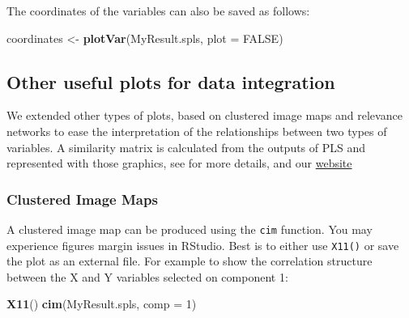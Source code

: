 \documentclass[]{book}
\newenvironment{Shaded}{\begin{snugshade}}{\end{snugshade}}
\newcommand{\DataTypeTok}[1]{\textcolor[rgb]{0.13,0.29,0.53}{#1}}
\newcommand{\DecValTok}[1]{\textcolor[rgb]{0.00,0.00,0.81}{#1}}
\newcommand{\KeywordTok}[1]{\textcolor[rgb]{0.13,0.29,0.53}{\textbf{#1}}}
\newcommand{\NormalTok}[1]{#1}
\newcommand{\OtherTok}[1]{\textcolor[rgb]{0.56,0.35,0.01}{#1}}
\newcommand{\StringTok}[1]{\textcolor[rgb]{0.31,0.60,0.02}{#1}}
\begin{document}
The coordinates of the variables can also be saved as follows:

\begin{Shaded}
\begin{Highlighting}[]
\NormalTok{coordinates <-}\StringTok{ }\KeywordTok{plotVar}\NormalTok{(MyResult.spls, }\DataTypeTok{plot =} \OtherTok{FALSE}\NormalTok{)}
\end{Highlighting}
\end{Shaded}

\hypertarget{other-useful-plots-for-data-integration}{%
\subsection{Other useful plots for data integration}\label{other-useful-plots-for-data-integration}}

We extended other types of plots, based on clustered image maps and relevance networks to ease the interpretation of the relationships between two types of variables. A similarity matrix is calculated from the outputs of PLS and represented with those graphics, see \citep{Gon12} for more details, and our \href{http://mixomics.org/graphics/variable-plots/}{website}

\hypertarget{clustered-image-maps}{%
\subsubsection{Clustered Image Maps}\label{clustered-image-maps}}

A clustered image map can be produced using the \texttt{cim} function. You may experience figures margin issues in RStudio. Best is to either use \texttt{X11()} or save the plot as an external file. For example to show the correlation structure between the X and Y variables selected on component 1:

\begin{Shaded}
\begin{Highlighting}[]
\KeywordTok{X11}\NormalTok{()}
\KeywordTok{cim}\NormalTok{(MyResult.spls, }\DataTypeTok{comp =} \DecValTok{1}\NormalTok{)}
\end{Highlighting}
\end{Shaded}
\end{document}
